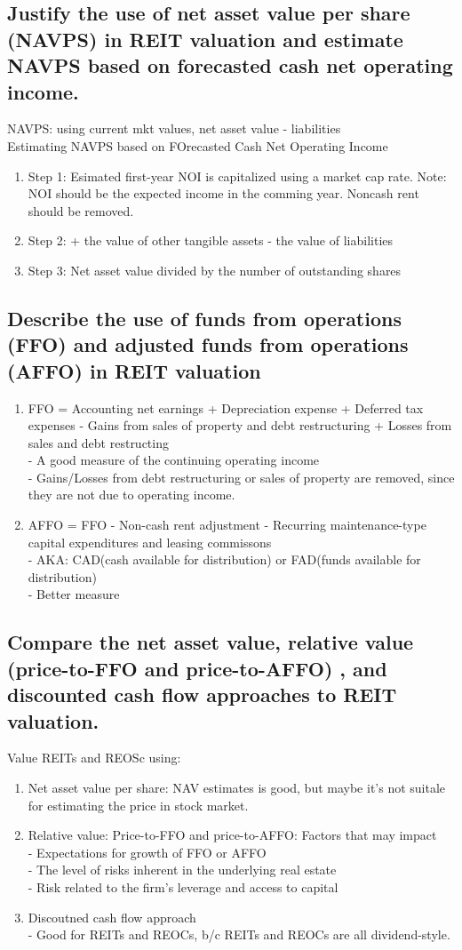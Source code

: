 \documentclass{article}
\newcommand{\be}{\begin{enumerate}}
\newcommand{\ee}{\end{enumerate}}
\begin{document}
\subsection{Justify the use of net asset value per share (NAVPS) in REIT valuation and estimate
NAVPS based on forecasted cash net operating income.}
NAVPS: using current mkt values, net asset value - liabilities
\\ Estimating NAVPS based on FOrecasted Cash Net Operating Income
\be
    \item Step 1: Esimated first-year NOI is capitalized using a market cap rate. Note: 
    NOI should be the expected income in the comming year. Noncash rent should be removed.
    \item Step 2: + the value of other tangible assets - the value of liabilities
    \item Step 3: Net asset value divided by the number of outstanding shares
\ee
\subsection{Describe the use of funds from operations (FFO) and adjusted funds from operations
(AFFO) in REIT valuation}
\be
    \item FFO = Accounting net earnings + Depreciation expense + Deferred tax expenses
    - Gains from sales of property and debt restructuring + Losses from sales and debt restructing
    \\ - A good measure of the continuing operating income
    \\ - Gains/Losses from debt restructuring or sales of property are removed, since they are not due to operating income.
    \item AFFO = FFO - Non-cash rent adjustment - Recurring maintenance-type capital expenditures
    and leasing commissons
    \\ - AKA: CAD(cash available for distribution) or FAD(funds available for distribution)
    \\ - Better measure
\ee
\subsection{Compare the net asset value, relative value (price-to-FFO and price-to-AFFO)
, and discounted cash flow approaches to REIT valuation.}
Value REITs and REOSc using:
\be
    \item Net asset value per share: NAV estimates is good, but maybe it's not suitale
    for estimating the price in stock market.
    \item Relative value: Price-to-FFO and price-to-AFFO: Factors that may impact
    \\- Expectations for growth of FFO or AFFO
    \\- The level of risks inherent in the underlying real estate
    \\- Risk related to the firm's leverage and access to capital
    \item Discoutned cash flow approach
    \\- Good for REITs and REOCs, b/c REITs and REOCs are all dividend-style.
\ee
\end{document}

